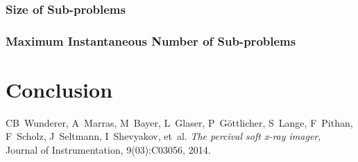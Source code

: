 \documentclass[journal]{IEEEtran}
\begin{document}
\subsubsection{Size of Sub-problems}


\subsubsection{Maximum Instantaneous Number of Sub-problems}

\section{Conclusion}	%


%
%
%

\begin{thebibliography}{1}

CB~Wunderer, A~Marras, M~Bayer, L~Glaser, P~G{\"o}ttlicher, S~Lange, F~Pithan,
  F~Scholz, J~Seltmann, I~Shevyakov, et~al.
\emph{The percival soft x-ray imager}, Journal of Instrumentation, 9(03):C03056, 2014.

\end{thebibliography}
\end{document}
